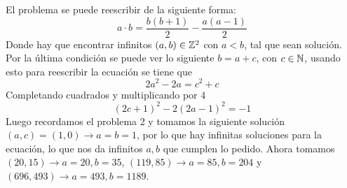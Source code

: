 \begin{sol}
	El problema se puede reescribir de la siguiente forma:
	\[
		a\cdot b=\frac{b(b+1)}2-\frac{a(a-1)}2
	\]
	Donde hay que encontrar infinitos $(a,b)\in\mathbb{Z}^2$ con $a<b$, tal que sean solución. Por la última condición se puede ver lo siguiente $b=a+c$, con $c\in\mathbb{N}$, usando esto para reescribir la ecuación se tiene que
	\[
		2a^2-2a=c^2+c
	\]
	Completando cuadrados y multiplicando por $4$
	\[
		(2c+1)^2-2(2a-1)^2=-1
	\]
	Luego recordamos el problema 2 y tomamos la siguiente solución $(a,c)=(1,0)\rightarrow a=b=1$, por lo que hay infinitas soluciones para la ecuación, lo que nos da infinitos $a,b$ que cumplen lo pedido. Ahora tomamos $(20,15)\rightarrow a=20, b=35$, $(119,85)\rightarrow a=85, b=204$ y $(696,493)\rightarrow a=493, b=1189$.
\end{sol}




